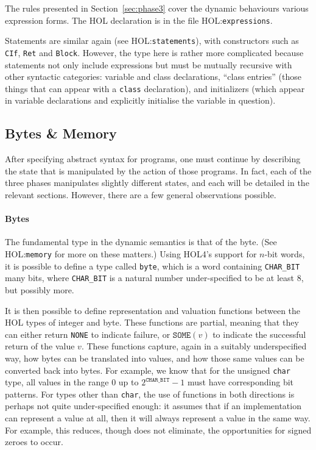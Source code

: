 \documentclass[11pt]{article}
\newcommand{\HOLfile}[1]{HOL:\texttt{#1}}
\begin{document}
The rules presented in Section~\ref{sec:phase3} cover the dynamic
behaviours various expression forms.  The HOL declaration is in the
file \HOLfile{expressions}.

Statements are similar again (see \HOLfile{statements}), with
constructors such as \texttt{CIf}, \texttt{Ret} and \texttt{Block}.
However, the type here is rather more complicated because statements
not only include expressions but must be mutually recursive with other
syntactic categories: variable and class declarations, ``class
entries'' (those things that can appear with a \texttt{class}
declaration), and initializers (which appear in variable declarations
and explicitly initialise the variable in question).

\subsection{Bytes \& Memory}
\label{sec:bytes-memory-states}

After specifying abstract syntax for programs, one must continue by
describing the state that is manipulated by the action of those
programs.   In fact, each of the three phases manipulates slightly
different states, and each will be detailed in the relevant sections.
However, there are a few general observations possible.

\paragraph{Bytes} The fundamental type in the dynamic semantics is
that of the byte.  (See \HOLfile{memory} for more on these matters.)
Using HOL4's support for $n$-bit words, it is possible to define a
type called \texttt{byte}, which is a word containing
\texttt{CHAR_BIT} many bits, where \texttt{CHAR_BIT} is a natural
number under-specified to be at least 8, but possibly more.

It is then possible to define representation and valuation functions
between the HOL types of integer and byte.  These functions are
partial, meaning that they can either return \texttt{NONE} to indicate
failure, or $\texttt{SOME}(v)$ to indicate the successful return of
the value $v$.  These functions capture, again in a suitably
underspecified way, how bytes can be translated into values, and how
those same values can be converted back into bytes.  For example, we
know that for the unsigned \texttt{char} type, all values in the range
$0$ up to $2^{\texttt{CHAR_BIT}}-1$ must have corresponding bit
patterns.  For types other than \texttt{char}, the use of functions in
both directions is perhaps not quite under-specified enough: it
assumes that if an implementation can represent a value at all, then
it will always represent a value in the same way.  For example, this
reduces, though does not eliminate, the opportunities for signed
zeroes to occur.
\end{document}
